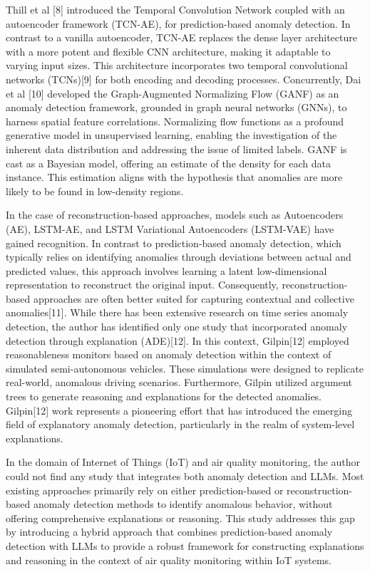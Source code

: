 \documentclass[final,3p,times,twocolumn]{elsarticle}
\begin{document}
Thill et al [8] introduced the Temporal Convolution Network coupled with an autoencoder framework (TCN-AE), for prediction-based anomaly detection. In contrast to a vanilla autoencoder, TCN-AE replaces the dense layer architecture with a more potent and flexible CNN architecture, making it adaptable to varying input sizes. This architecture incorporates two temporal convolutional networks (TCNs)[9] for both encoding and decoding processes. Concurrently, Dai et al [10] developed the Graph-Augmented Normalizing Flow (GANF) as an anomaly detection framework, grounded in graph neural networks (GNNs), to harness spatial feature correlations. Normalizing flow functions as a profound generative model in unsupervised learning, enabling the investigation of the inherent data distribution and addressing the issue of limited labels. GANF is cast as a Bayesian model, offering an estimate of the density for each data instance. This estimation aligns with the hypothesis that anomalies are more likely to be found in low-density regions.

In the case of reconstruction-based approaches, models such as Autoencoders (AE), LSTM-AE, and LSTM Variational Autoencoders (LSTM-VAE) have gained recognition. In contrast to prediction-based anomaly detection, which typically relies on identifying anomalies through deviations between actual and predicted values, this approach involves learning a latent low-dimensional representation to reconstruct the original input. Consequently, reconstruction-based approaches are often better suited for capturing contextual and collective anomalies[11].
While there has been extensive research on time series anomaly detection, the author has identified only one study that incorporated anomaly detection through explanation (ADE)[12]. In this context, Gilpin[12] employed reasonableness monitors based on anomaly detection within the context of simulated semi-autonomous vehicles. These simulations were designed to replicate real-world, anomalous driving scenarios. Furthermore, Gilpin utilized argument trees to generate reasoning and explanations for the detected anomalies. Gilpin[12] work represents a pioneering effort that has introduced the emerging field of explanatory anomaly detection, particularly in the realm of system-level explanations.

In the domain of Internet of Things (IoT) and air quality monitoring, the author could not find any study that integrates both anomaly detection and LLMs. Most existing approaches primarily rely on either prediction-based or reconstruction-based anomaly detection methods to identify anomalous behavior, without offering comprehensive explanations or reasoning. This study addresses this gap by introducing a hybrid approach that combines prediction-based anomaly detection with LLMs to provide a robust framework for constructing explanations and reasoning in the context of air quality monitoring within IoT systems.
\end{document}
